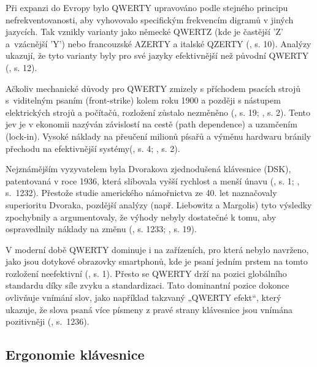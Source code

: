 \documentclass[a4paper, twoside, 12pt, czech]{article}
\begin{document}
Při expanzi do Evropy bylo QWERTY upravováno podle stejného principu 
nefrekventovanosti, aby vyhovovalo specifickým frekvencím digramů v jiných 
jazycích. Tak vznikly varianty jako německé QWERTZ (kde je častější 'Z' a~vzácněj\-ší 'Y') 
nebo francouzské AZERTY a italské QZERTY (\cite{lockin}, s. 10). Analýzy ukazují, že 
tyto varianty byly pro své jazyky efektivnější než původní QWERTY (\cite{lockin}, s. 12).

Ačkoliv mechanické důvody pro QWERTY zmizely s příchodem psacích stro\-jů 
s~viditelným psaním (front-strike) kolem roku 1900 a později s nástupem 
elektrických strojů a počítačů, rozložení zůstalo nezměněno (\cite{lockin}, s. 19; 
\cite{hidden-in-plain-sight}, s. 2). Tento jev je v 
ekonomii nazýván závislostí na cestě (path dependence) a uzamčením (lock-in). 
Vysoké náklady na přeučení milionů písařů a výměnu hardwaru bránily přechodu na 
efektivnější systémy(\cite{lockin}, s. 4; \cite{hidden-in-plain-sight}, s. 2).

Nejznámějším vyzyvatelem byla Dvorakova zjednodušená klávesnice (DSK), 
patentovaná v roce 1936, která slibovala vyšší rychlost a menší únavu (\cite{applicationAlgo}, s. 1; 
\cite{qwerty-dilemma}, s.~1232). Přestože 
studie amerického námořnictva ze 40. let naznačovaly superioritu Dvoraka, 
pozdější analýzy (např. Liebowitz a Margolis) tyto výsledky zpochybnily a 
argumentovaly, že výhody nebyly dostatečné k tomu, aby ospravedlnily náklady na 
změnu (\cite{qwerty-dilemma}, s. 1233; \cite{lockin}, s. 19).

V moderní době QWERTY dominuje i na zařízeních, pro která nebylo navrže\-no, jako 
jsou dotykové obrazovky smartphonů, kde je psaní jedním prstem na tomto rozložení 
neefektivní (\cite{7814594}, s. 1). Přesto se QWERTY drží na pozici globální\-ho standardu 
díky síle zvyku a standardizaci. Tato dominantní pozice dokonce ovliv\-ňuje vnímání slov, jako například 
takzvaný „QWERTY 
efekt“, který ukazuje, že slova psaná více písmeny z pravé strany klávesnice jsou 
vnímána pozitivněji (\cite{qwerty-dilemma}, s.~1236).

\subsection{Ergonomie klávesnice}
\end{document}
